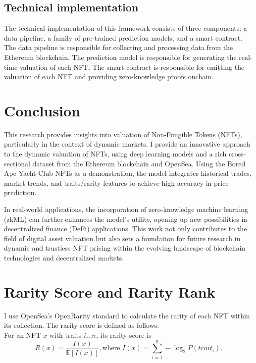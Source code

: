 \documentclass[12pt]{article}
\begin{document}
\subsection{Technical implementation}
The technical implementation of this framework consists of three components: a data pipeline, a family of pre-trained prediction models, and a smart contract. The data pipeline is responsible for collecting and processing data from the Ethereum blockchain. The prediction model is responsible for generating the real-time valuation of each NFT. The smart contract is responsible for emitting the valuation of each NFT and providing zero-knowledge proofs onchain.



\section{Conclusion}
\label{sec: conclusion}

This research provides insights into valuation of Non-Fungible Tokens (NFTs), particularly in the context of dynamic markets. I provide an innovative approach to the dynamic valuation of NFTs, using deep learning models and a rich cross-sectional dataset from the Ethereum blockchain and OpenSea. Using the Bored Ape Yacht Club NFTs as a demonstration, the model integrates historical trades, market trends, and traits/rarity features to achieve high accuracy in price prediction. 

In real-world applications, the incorporation of zero-knowledge machine learning (zkML) can further enhances the model's utility, opening up new possibilities in decentralized finance (DeFi) applications. This work not only contributes to the field of digital asset valuation but also sets a foundation for future research in dynamic and trustless NFT pricing within the evolving landscape of blockchain technologies and decentralized markets.




\newpage
\nocite{*}
\printbibliography

\newpage
\appendix

\section{Rarity Score and Rarity Rank}
\label{app: rarity}
I use OpenSea's OpenRarity standard to calculate the rarity of each NFT within its collection. The rarity score is defined as follows:\\
For an NFT $x$ with traits $i\dots n$, its rarity score is
\[R(x) = \frac{I(x)}{\mathbb{E}[I(x)]}, \text{where } I(x)=\sum_{i=1}^n -\log_2P(trait_i).\] 

\end{document}
